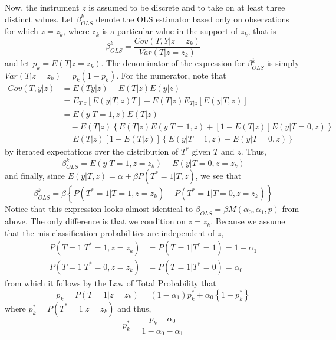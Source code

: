 Now, the instrument $z$ is assumed to be discrete and to take on at least three distinct values.
Let $\beta_{OLS}^k$ denote the OLS estimator based only on observations for which $z = z_k$, where $z_k$ is a particular value in the support of $z_k$, that is
\begin{equation*}
  \beta_{OLS}^k = \frac{Cov(T,Y| z = z_k)}{Var(T|z=z_k)} 
\end{equation*}
and let $p_k = E(T|z=z_k)$.
The denominator of the expression for $\beta_{OLS}^k$ is simply $Var(T|z=z_k) = p_k(1-p_k)$.
For the numerator, note that
\begin{align*}
  Cov(T,y|z) &= E(Ty|z) - E(T|z)E(y|z)\\
  &= E_{T|z}\left[E\left( y|T,z \right)T  \right] - E(T|z) E_{T|z}\left[ E(y|T,z) \right]\\
  &= E(y|T=1,z)E(T|z)\\
  &\quad - E(T|z)\left\{ E(T|z)E(y|T=1,z) + [1 - E(T|z)]E(y|T=0,z) \right\}\\
  &= E(T|z)\left[ 1-E(T|z) \right]\left\{ E(y|T=1,z) - E(y|T=0,z) \right\}
\end{align*}
by iterated expectations over the distribution of $T^*$ given $T$ and $z$.
Thus, 
\begin{equation*}
  \beta_{OLS}^k = E\left( y | T=1,z=z_k \right) - E(y|T=0,z=z_k)
\end{equation*}
and finally, since $E(y|T,z) = \alpha + \beta P(T^*=1|T,z)$, we see that
\begin{equation*}
  \beta_{OLS}^k = \beta \left\{P\left( T^*=1|T=1,z=z_k \right) - P(T^*=1|T=0, z=z_k)  \right\}
\end{equation*}
Notice that this expression looks almost identical to $\beta_{OLS} = \beta M(\alpha_0, \alpha_1, p)$ from above.
The only difference is that we condition on $z=z_k$.
Because we assume that the mis-classification probabilities are independent of $z$, 
\begin{align*}
  P(T=1|T^*=1, z=z_k) &= P(T=1|T^*=1) = 1-\alpha_1\\
  P(T=1|T^*=0, z=z_k) &= P(T=1|T^*=0) = \alpha_0
\end{align*}
from which it follows by the Law of Total Probability that
\begin{equation*}
  p_k = P(T=1|z=z_k) = (1-\alpha_1) p_k^* + \alpha_0\left\{ 1 - p_k^* \right\}
\end{equation*}
where $p^*_k = P(T^*=1|z=z_k)$ and thus,
\begin{equation*}
  p^*_k = \frac{p_k - \alpha_0}{1 - \alpha_0 - \alpha_1}
\end{equation*}
